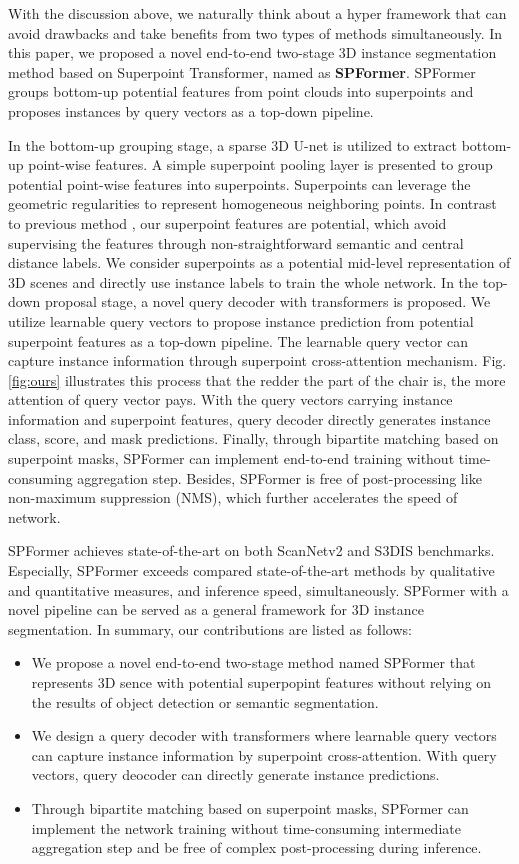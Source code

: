 \documentclass[letterpaper]{article} \usepackage{aaai23}  \usepackage{times}  \usepackage{helvet}  \usepackage{courier}  \usepackage[hyphens]{url}  \usepackage{graphicx} \urlstyle{rm} \def\UrlFont{\rm}  \usepackage{natbib}  \usepackage{caption} \frenchspacing  \setlength{\pdfpagewidth}{8.5in}  \setlength{\pdfpageheight}{11in}  \usepackage{algorithm}
\begin{document}
With the discussion above, we naturally think about a hyper framework that can avoid drawbacks and take benefits from two types of methods simultaneously. In this paper, we proposed a novel end-to-end two-stage 3D instance segmentation method based on Superpoint Transformer, named as \textbf{SPFormer}. SPFormer groups bottom-up potential features from point clouds into superpoints and proposes instances by query vectors as a top-down pipeline. 

In the bottom-up grouping stage, a sparse 3D U-net is utilized to extract bottom-up point-wise features. A simple superpoint pooling layer is presented to group potential point-wise features into superpoints. Superpoints \cite{superpoint} can leverage the geometric regularities to represent homogeneous neighboring points. In contrast to previous method \cite{sstnet}, our superpoint features are potential, which avoid supervising the features through non-straightforward semantic and central distance labels. We consider superpoints as a potential mid-level representation of 3D scenes and directly use instance labels to train the whole network. In the top-down proposal stage, a novel query decoder with transformers is proposed. We utilize learnable query vectors to propose instance prediction from potential superpoint features as a top-down pipeline. The learnable query vector can capture instance information through superpoint cross-attention mechanism. Fig. \ref{fig:ours} illustrates this process that the redder the part of the chair is, the more attention of query vector pays. With the query vectors carrying instance information and superpoint features, query decoder directly generates instance class, score, and mask predictions. Finally, through bipartite matching based on superpoint masks, SPFormer can implement end-to-end training without time-consuming aggregation step. Besides, SPFormer is free of post-processing like non-maximum suppression (NMS), which further accelerates the speed of network.

SPFormer achieves state-of-the-art on both ScanNetv2 and S3DIS benchmarks. Especially, SPFormer exceeds compared state-of-the-art methods by qualitative and quantitative measures, and inference speed, simultaneously. SPFormer with a novel pipeline can be served as a general framework for 3D instance segmentation. In summary, our contributions are listed as follows:

\begin{itemize}
    \item We propose a novel end-to-end two-stage method named SPFormer that represents 3D sence with potential superpopint features without relying on the results of object detection or semantic segmentation.
    \item We design a query decoder with transformers where learnable query vectors can capture instance information by superpoint cross-attention. With query vectors, query deocoder can directly generate instance predictions.
    \item Through bipartite matching based on superpoint masks, SPFormer can implement the network training without time-consuming intermediate aggregation step and be free of complex post-processing during inference.
\end{itemize}
\end{document}
